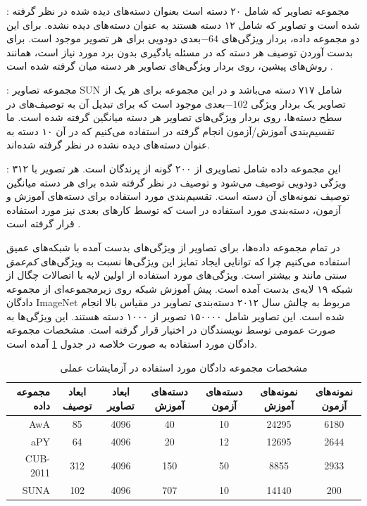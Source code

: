 \textbf{}\cite{farhadi09}:
مجموعه تصاویر
  \cite{pascal}
 که شامل ۲۰ دسته است بعنوان دسته‌های دیده شده در نظر گرفته شده است و تصاویر  که شامل ۱۲ دسته هستند به عنوان دسته‌های دیده نشده. برای این دو مجموعه داده، بردار ویژگی‌های $-64$بعدی دودویی برای هر تصویر موجود است. برای بدست آوردن توصیف هر دسته که در مسئله یادگیری بدون برد مورد نیاز است، همانند روش‌های پیشین، روی بردار ویژگی‌های تصاویر هر دسته میان گرفته
 شده است  \cite{lampert09}.


\textbf{} \cite{sun}:
مجموعه تصاویر SUN شامل ۷۱۷ دسته می‌باشد و در این مجموعه برای هر یک از تصاویر یک بردار ویژگی $-102$بعدی موجود است که برای تبدیل آن به توصیف‌های در سطح دسته‌ها، روی بردار ویژگی‌های تصاویر هر دسته میانگین گرفته شده است. ما تقسیم‌بندی آموزش/آزمون انجام گرفته در \cite{jayaraman14} استفاده می‌کنیم که در آن ۱۰ دسته به عنوان دسته‌های دیده نشده در نظر گرفته شده‌اند.

\textbf{} \cite{cub}:
این مجموعه داده شامل تصاویری از ۲۰۰ گونه از پرندگان است. هر تصویر با ۳۱۲ ویژگی دودویی توصیف می‌شود و توصیف در نظر گرفته شده برای هر دسته میانگین توصیف نمونه‌های آن دسته است. تقسیم‌بندی مورد استفاده برای دسته‌های آموزش و آزمون، دسته‌بندی مورد استفاده در \cite{akata13} است که توسط کارهای بعدی نیز مورد استفاده قرار گرفته است
\cite{sse, Akata2015, Reed2016}.


در تمام مجموعه داده‌ها، برای تصاویر از ویژگی‌های بدست آمده با شبکه‌های عمیق استفاده می‌کنیم چرا که توانایی ایجاد تمایز این ویژگی‌ها نسبت به ویژگی‌های
\textit{کم‌عمق}
سنتی مانند   و   بیشتر است.
ویژگی‌های مورد استفاده از  اولین لایه با اتصالات چگال از شبکه ۱۹ لایه‌ی  \cite{vgg} بدست آمده است. پیش آموزش شبکه  روی زیرمجموعه‌ای از
مجموعه دادگان ImageNet
\cite{imagenet}
مربوط به چالش سال ۲۰۱۲ دسته‌بندی تصاویر در مقیاس بالا
 \cite{ILSVRC15} انجام شده است.
 این تصاویر شامل ۱۵۰۰۰۰ تصویر از ۱۰۰۰ دسته هستند.
 این ویژگی‌ها به صورت عمومی توسط نویسندگان
\cite{sse}
در اختیار قرار گرفته است.
مشخصات مجموعه دادگان مورد استفاده به صورت خلاصه در جدول \ref{tab:datasets} آمده است.
\begin{center}

\begin{table}[ht]
\centering
\caption{مشخصات مجموعه دادگان مورد استفاده در آزمایشات عملی}
\vspace{2mm}
\label{tab:datasets}
\begin{tabular}{|r|c|c|c|c|c|c|}
\hline
 مجموعه داده & ابعاد توصیف‌ & ابعاد تصاویر &  دسته‌های آموزش & دسته‌های آزمون &  نمونه‌های آموزش &  نمونه‌های آزمون \\
\hline
AwA
& 85 & 4096 & 40 & 10 & 24295 & 6180 \\\hline
 aPY
& 64 & 4096 & 20 & 12 & 12695 & 2644 \\\hline
CUB-2011
& 312 & 4096 & 150 & 50 & 8855 & 2933 \\ \hline
 SUNA
& 102 & 4096 & 707 & 10 & 14140 & 200 \\
\hline
\end{tabular}
\end{table}
\end{center}


